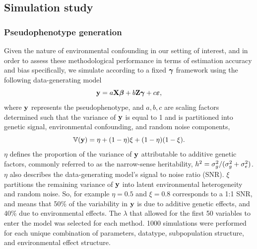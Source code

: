 
\subsection{Simulation study}
\subsubsection{Pseudophenotype generation}

Given the nature of environmental confounding in our setting of interest, and in order to assess these methodological performance in terms of estimation accuracy and bias specifically, we simulate according to a fixed $\boldsymbol{\gamma}$ framework using the following data-generating model
\begin{equation}
    \label{eqn:sim}
    \textbf{y} = a \textbf{X} \boldsymbol{\beta}{} + b \textbf{Z} \boldsymbol{\gamma} + c \boldsymbol{\varepsilon}{},
\end{equation}
where $\textbf{y}$ represents the pseudophenotype, and $a, b, c$ are scaling factors determined such that the variance of $\textbf{y}$ is equal to 1 and is partitioned into genetic signal, environmental confounding, and random noise components,
\begin{equation}
    \label{eqn:parition_y}
    \mathbb{V}(\textbf{y}) = \eta + (1 - \eta) \xi + (1-\eta)(1-\xi).
\end{equation}
$\eta$ defines the proportion of the variance of $\textbf{y}$ attributable to additive genetic factors, commonly referred to as the narrow-sense heritability, $h^2 = \sigma^2_g/(\sigma^2_g + \sigma^2_e)$. $\eta$ also describes the data-generating model's signal to noise ratio (SNR). $\xi$ partitions the remaining variance of $\textbf{y}$ into latent environmental heterogeneity and random noise. So, for example $\eta = 0.5$ and $\xi = 0.8$ corresponds to a 1:1 SNR, and means that 50\% of the variability in $\textbf{y}$ is due to additive genetic effects, and 40\% due to environmental effects.  The $\lambda$ that allowed for the first 50 variables to enter the model was selected for each method. 1000 simulations were performed for each unique combination of parameters, datatype, subpopulation structure, and environmental effect structure. 

